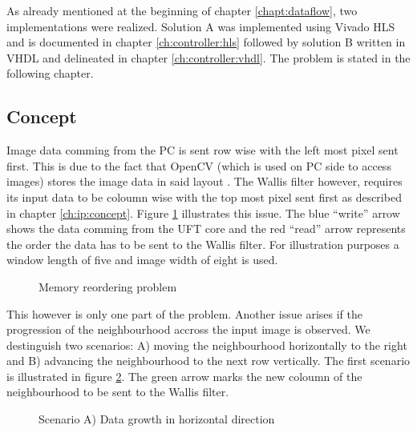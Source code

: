 As already mentioned at the beginning of chapter \ref{chapt:dataflow}, two
implementations were realized. Solution A was implemented using Vivado HLS and
is documented in chapter \ref{ch:controller:hls} followed by solution B written
in VHDL and delineated in chapter \ref{ch:controller:vhdl}. The problem is
stated in the following chapter.

\subsection{Concept} \label{ch:control:concept}
Image data comming from the PC is sent row wise with the left most pixel sent
first. This is due to the fact that OpenCV (which is used on PC side to access
images) stores the image data in said layout \cite{opencv_structures}. The
Wallis filter however, requires its input data to be coloumn wise with the top
most pixel sent first as described in chapter \ref{ch:ip:concept}. Figure 
\ref{fig:memproblem} illustrates this issue. The blue ``write'' arrow shows the data
comming from the UFT core and the red ``read'' arrow represents the order the
data has to be sent to the Wallis filter. For illustration purposes a window
length of five and image width of eight is used.

\begin{figure}[H]
    \centering
    \begin{adjustbox}{scale=0.7}
        
    \end{adjustbox}
    \caption{Memory reordering problem}
    \label{fig:memproblem}
\end{figure}

This however is only one part of the problem. Another issue arises if the
progression of the neighbourhood accross the input image is observed. We
destinguish two scenarios: A) moving the neighbourhood horizontally to the right
and B) advancing the neighbourhood to the next row vertically. The first
scenario is illustrated in figure \ref{fig:memproblemgrowthx}. The green arrow
marks the new coloumn of the neighbourhood to be sent to the Wallis filter.

\begin{figure}[H]
    \centering
    \begin{adjustbox}{scale=0.7}
        
    \end{adjustbox}
    \caption{Scenario A) Data growth in horizontal direction}
    \label{fig:memproblemgrowthx}
\end{figure}

